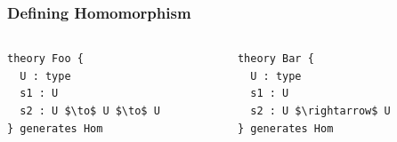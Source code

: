 \documentclass[t,12pt,numbers,fleqn,usenames,xcolor=dvipsnames]{beamer}
\begin{document}
\begin{frame}[fragile]
\frametitle{Defining Homomorphism}
\begin{columns}
\begin{column}{0.45\textwidth}
	\begin{lstlisting}
theory Foo { 
  U : type 
  s1 : U 
  s2 : U $\to$ U $\to$ U
} generates Hom 
	\end{lstlisting}
\end{column}
\begin{column}{0.45\textwidth}
	\begin{lstlisting}
theory Bar {
  U : type 
  s1 : U 
  s2 : U $\rightarrow$ U 
} generates Hom 
	\end{lstlisting}
\end{column}
\end{columns}
\end{frame}

		

\end{document}
